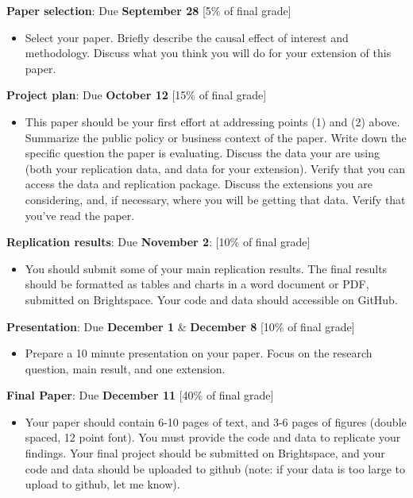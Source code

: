 \documentclass[compress, 8pt]{beamer}
\begin{document}
\begin{frame}{}

\textbf{Paper selection}: Due \textbf{September 28} [5\% of final grade]
\begin{itemize}
\item Select your paper. Briefly describe the causal effect of interest and methodology. Discuss what you think you will do for your extension of this paper. 
\end{itemize}

\textbf{Project plan}: Due \textbf{October 12} [15\% of final grade] 
\begin{itemize}
\item This paper should be your first effort at addressing points (1) and (2) above.
Summarize the public policy or business context of the paper. Write down the
specific question the paper is evaluating. Discuss the data your are using (both your replication data, and data for your extension). Verify that you can access the data and replication package. Discuss the extensions you are considering, and, if necessary, where you will be getting that data. Verify that you’ve read the paper.
\end{itemize} 

\textbf{Replication results}: Due \textbf{November 2}: [10\% of final grade]
\begin{itemize}
\item You should submit some of your main replication results. The final results should be formatted as tables and charts in a word document or PDF, submitted on Brightspace. Your code and data should accessible on GitHub.
\end{itemize}

\textbf{Presentation}: Due \textbf{December 1} \& \textbf{December 8} [10\% of final grade]
\begin{itemize}
\item Prepare a 10 minute presentation on your paper. Focus on the research question, main result, and one extension. 
\end{itemize}

\textbf{Final Paper}: Due \textbf{December 11} [40\% of final grade]
\begin{itemize}
\item Your paper should contain 6-10 pages of text, and 3-6 pages of figures (double spaced, 12 point font).
You must provide the code and data to replicate your findings. 
Your final project should be submitted on Brightspace, and your code and data should be uploaded to github (note: if your data is too large to upload to github, let me know). 
\end{itemize}

\end{frame}
\end{document}
